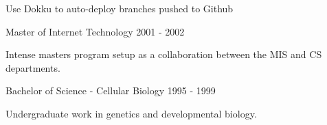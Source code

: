 \documentclass[11pt]{article} %
\begin{document}
        {}
        {Use Dokku to auto-deploy branches pushed to Github}


\begin{description}
\squish
{}
           {Master of Internet Technology}
           {2001 - 2002}

Intense masters program setup as a collaboration between the MIS  and CS departments.

           {Bachelor of Science - Cellular Biology}
           {1995 - 1999}

Undergraduate work in genetics and developmental biology.

\end{description}

%
%
%
%
%
\end{document}
